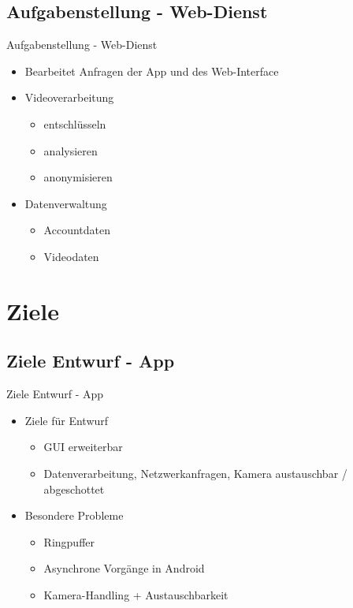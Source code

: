 \documentclass[19pt]{beamer}
\begin{document}
\subsection{Aufgabenstellung - Web-Dienst}
\begin{frame}{Aufgabenstellung - Web-Dienst}
	\begin{itemize}
		\item Bearbeitet Anfragen der App und des Web-Interface
		\item Videoverarbeitung
			\begin{itemize}
				\item entschl\"usseln
				\item analysieren
				\item anonymisieren
			\end{itemize}
		\item Datenverwaltung
			\begin{itemize}
				\item Accountdaten
				\item Videodaten
			\end{itemize}
	\end{itemize}
\end{frame}


\section{Ziele}
\subsection{Ziele Entwurf - App}
\begin{frame}{Ziele Entwurf - App}
	\begin{itemize}
    	\item Ziele für Entwurf
		\begin{itemize}
			\item GUI erweiterbar
			\item Datenverarbeitung, Netzwerkanfragen, Kamera austauschbar / abgeschottet
		\end{itemize}
		\item Besondere Probleme
		\begin{itemize}
			\item Ringpuffer
			\item Asynchrone Vorgänge in Android
			\item Kamera-Handling + Austauschbarkeit
		\end{itemize}
	\end{itemize}
\end{frame}
\end{document}

